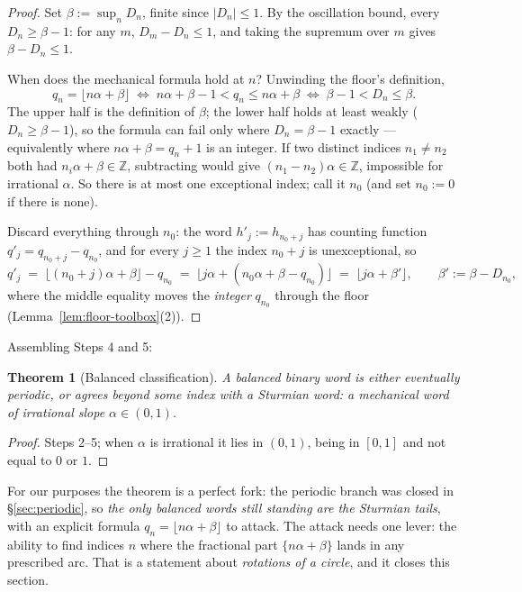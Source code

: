 \documentclass[11pt,reqno]{amsart}
\theoremstyle{plain}
\newtheorem{theorem}{Theorem}[section]
\theoremstyle{definition}
\theoremstyle{remark}
\newcommand{\ZZ}{\mathbb{Z}}
\begin{document}
\begin{proof}
Set $\beta := \sup_n D_n$, finite since $|D_n| \le 1$. By the oscillation bound,
every $D_n \ge \beta - 1$: for any $m$, $D_m - D_n \le 1$, and taking the supremum
over $m$ gives $\beta - D_n \le 1$.

When does the mechanical formula hold at $n$? Unwinding the floor's definition,
\[
  q_n = \lfloor n\alpha + \beta \rfloor
  \;\iff\; n\alpha + \beta - 1 < q_n \le n\alpha + \beta
  \;\iff\; \beta - 1 < D_n \le \beta .
\]
The upper half is the definition of $\beta$; the lower half holds at least weakly
($D_n \ge \beta - 1$), so the formula can fail only where $D_n = \beta - 1$ exactly
--- equivalently where $n\alpha + \beta = q_n + 1$ is an integer. If two distinct
indices $n_1 \ne n_2$ both had $n_i \alpha + \beta \in \ZZ$, subtracting would give
$(n_1 - n_2)\alpha \in \ZZ$, impossible for irrational $\alpha$. So there is at
most one exceptional index; call it $n_0$ (and set $n_0 := 0$ if there is none).

Discard everything through $n_0$: the word $h'_j := h_{n_0 + j}$ has counting
function $q'_j = q_{n_0 + j} - q_{n_0}$, and for every $j \ge 1$ the index
$n_0 + j$ is unexceptional, so
\[
  q'_j \;=\; \lfloor (n_0 + j)\alpha + \beta \rfloor - q_{n_0}
       \;=\; \lfloor j\alpha + (n_0\alpha + \beta - q_{n_0}) \rfloor
       \;=\; \lfloor j\alpha + \beta' \rfloor,
  \qquad \beta' := \beta - D_{n_0} ,
\]
where the middle equality moves the \emph{integer} $q_{n_0}$ through the floor
(Lemma~\ref{lem:floor-toolbox}(2)).
\end{proof}

Assembling Steps 4 and 5:

\begin{theorem}[Balanced classification]\label{thm:mh-friendly}
A balanced binary word is either eventually periodic, or agrees beyond some index
with a Sturmian word: a mechanical word of irrational slope $\alpha \in (0,1)$.
\end{theorem}

\begin{proof}
Steps 2--5; when $\alpha$ is irrational it lies in $(0,1)$, being in $[0,1]$ and not
equal to $0$ or $1$.
\end{proof}

For our purposes the theorem is a perfect fork: the periodic branch was closed in
\S\ref{sec:periodic}, so \emph{the only balanced words still standing are the
Sturmian tails}, with an explicit formula $q_n = \lfloor n\alpha + \beta \rfloor$ to
attack. The attack needs one lever: the ability to find indices $n$ where the
fractional part $\{n\alpha + \beta\}$ lands in any prescribed arc. That is a
statement about \emph{rotations of a circle}, and it closes this section.
\end{document}
